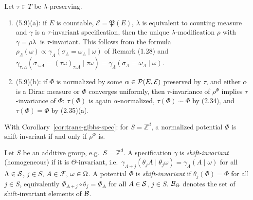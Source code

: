 \begin{remark}
    \label{rmk:trans-59-converse}

    Let $\tau \in T$ be $\lambda$-preserving.
    \begin{enumerate}
        \item (5.9)(a): if $E$ is countable, $\mathcal{E} = \mathfrak{P}(E)$, $\lambda$ is
        equivalent to counting measure and $\gamma$ is a $\tau$-invariant specification, then the
        unique $\lambda$-modification $\rho$ with $\gamma = \rho\lambda_\cdot$ is
        $\tau$-invariant.  This follows from the formula
        $\rho_\Lambda(\omega) \propto \gamma_\Lambda(\sigma_\Lambda = \omega_\Lambda \mid \omega)$
        of Remark (1.28) and $\gamma_{\tau_*\Lambda}(\sigma_{\tau_*\Lambda} = (\tau\omega)_{\tau_*\Lambda}
        \mid \tau\omega) = \gamma_\Lambda(\sigma_\Lambda = \omega_\Lambda \mid \omega)$.
        \item (5.9)(b): if $\Phi$ is normalized by some $\alpha \in \mathcal{P}(E, \mathcal{E})$
        preserved by $\tau$, and either $\alpha$ is a Dirac measure or $\Phi$ converges uniformly,
        then $\tau$-invariance of $\rho^\Phi$ implies $\tau$-invariance of $\Phi$: $\tau(\Phi)$ is
        again $\alpha$-normalized, $\tau(\Phi) \sim \Phi$ by (2.34), and $\tau(\Phi) = \Phi$ by
        (2.35)(a).
    \end{enumerate}
    With Corollary~\ref{cor:trans-gibbs-spec}: for $S = \mathbb{Z}^d$, a normalized potential
    $\Phi$ is shift-invariant if and only if $\rho^\Phi$ is.
\end{remark}

\begin{example}
    \label{ex:trans-shift-invariant}
    \leanok

    Let $S$ be an additive group, e.g.\ $S = \mathbb{Z}^d$.  A specification $\gamma$ is
    \emph{shift-invariant} (homogeneous) if it is $\Theta$-invariant, i.e.\
    $\gamma_{\Lambda+j}(\theta_j A \mid \theta_j\omega) = \gamma_\Lambda(A\mid\omega)$ for all
    $\Lambda \in \mathcal{S}$, $j \in S$, $A \in \mathcal{F}$, $\omega \in \Omega$.  A potential $\Phi$ is
    \emph{shift-invariant} if $\theta_j(\Phi) = \Phi$ for all $j \in S$, equivalently
    $\Phi_{A+j} \circ \theta_j = \Phi_A$ for all $A \in \mathcal{S}$, $j \in S$.  $\mathcal{B}_\Theta$
    denotes the set of shift-invariant elements of $\mathcal{B}$.
\end{example}

